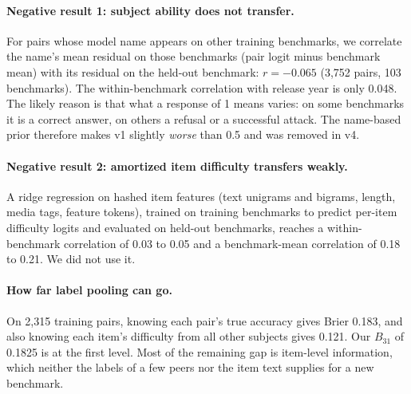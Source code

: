\documentclass{article}
\begin{document}
\paragraph{Negative result 1: subject ability does not transfer.} For pairs whose model name
appears on other training benchmarks, we correlate the name's mean residual on those benchmarks (pair
logit minus benchmark mean) with its residual on the held-out benchmark: $r=-0.065$ (3,752 pairs, 103
benchmarks). The within-benchmark correlation with release year is only 0.048. The likely reason is
that what a response of 1 means varies: on some benchmarks it is a correct answer, on others a
refusal or a successful attack. The name-based prior therefore makes v1 slightly \emph{worse}
than 0.5 and was removed in v4.

\paragraph{Negative result 2: amortized item difficulty transfers weakly.} A ridge regression on
hashed item features (text unigrams and bigrams, length, media tags, feature tokens), trained on
training benchmarks to predict per-item difficulty logits and evaluated on held-out benchmarks,
reaches a within-benchmark correlation of 0.03 to 0.05 and a benchmark-mean correlation of 0.18 to 0.21.
We did not use it.

\paragraph{How far label pooling can go.} On 2,315 training pairs, knowing each pair's true accuracy
gives Brier 0.183, and also knowing each item's difficulty from all other subjects gives 0.121. Our
$B_{31}$ of 0.1825 is at the first level. Most of the remaining gap is item-level information, which
neither the labels of a few peers nor the item text supplies for a new benchmark.
\end{document}
